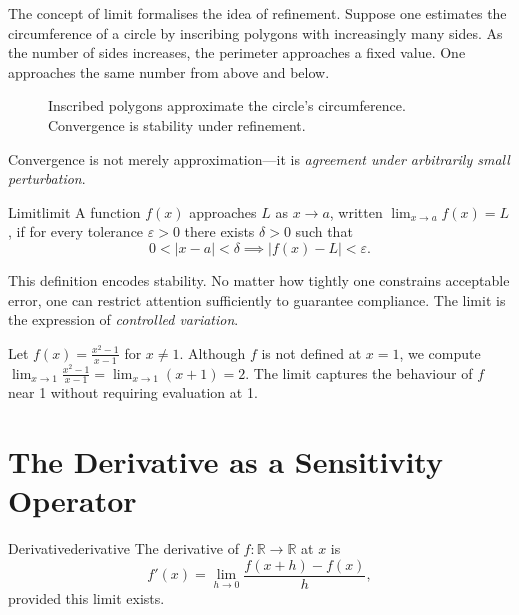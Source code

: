 \documentclass[12pt,openany]{book}
\newcommand{\R}{\mathbb{R}}
\begin{document}
The concept of limit formalises the idea of refinement. Suppose one estimates
the circumference of a circle by inscribing polygons with increasingly many
sides. As the number of sides increases, the perimeter approaches a fixed value.
One approaches the same number from above and below.

\begin{figure}[H]
\centering
{}
\caption{Inscribed polygons approximate the circle's circumference. Convergence
is stability under refinement.}
\label{fig:polygon-limit}
\end{figure}

Convergence is not merely approximation—it is \emph{agreement under arbitrarily
small perturbation}.

\begin{definition}{Limit}{limit}
  A function $f(x)$ approaches $L$ as $x \to a$, written
  $\displaystyle\lim_{x\to a} f(x) = L$,
  if for every tolerance $\varepsilon > 0$ there exists $\delta > 0$ such that
  \[
    0 < |x - a| < \delta \implies |f(x) - L| < \varepsilon.
  \]
\end{definition}

This definition encodes stability. No matter how tightly one constrains
acceptable error, one can restrict attention sufficiently to guarantee
compliance. The limit is the expression of \emph{controlled variation}.

\begin{example}
  Let $f(x) = \frac{x^2 - 1}{x-1}$ for $x \neq 1$. Although $f$ is not
  defined at $x=1$, we compute
  $\lim_{x\to 1}\frac{x^2-1}{x-1} = \lim_{x\to 1}(x+1) = 2.$
  The limit captures the behaviour of $f$ near 1 without requiring evaluation
  at 1.
\end{example}

\section{The Derivative as a Sensitivity Operator}
\label{sec:deriv-sensitivity}

\begin{definition}{Derivative}{derivative}
  The derivative of $f:\R\to\R$ at $x$ is
  \[
    f'(x) = \lim_{h \to 0} \frac{f(x+h) - f(x)}{h},
  \]
  provided this limit exists.
\end{definition}
\end{document}
